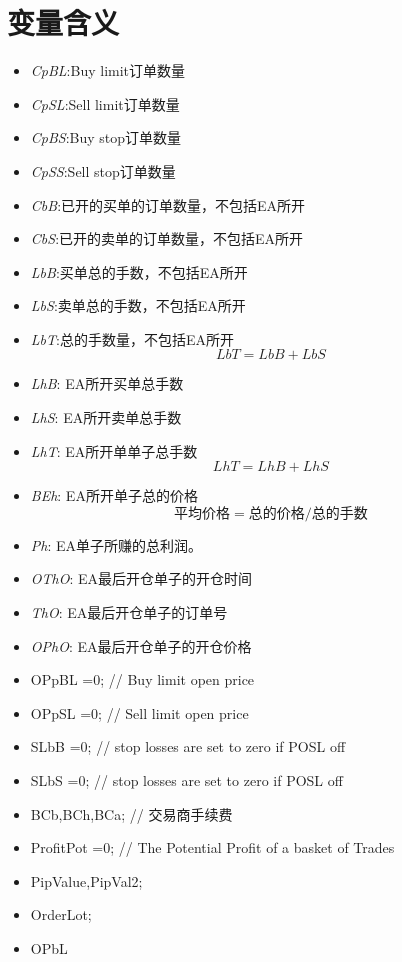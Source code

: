 \section{变量含义}
\begin{itemize}

\item \textit{CpBL}:Buy limit订单数量
\item \textit{CpSL}:Sell limit订单数量
\item \textit{CpBS}:Buy stop订单数量
\item \textit{CpSS}:Sell stop订单数量


\item \textit{CbB}:已开的买单的订单数量，不包括EA所开
\item \textit{CbS}:已开的卖单的订单数量，不包括EA所开
\item \textit{LbB}:买单总的手数，不包括EA所开
\item \textit{LbS}:卖单总的手数，不包括EA所开    
\item \textit{LbT}:总的手数量，不包括EA所开$$LbT = LbB+LbS $$



\item \textit{LhB}: EA所开买单总手数
\item \textit{LhS}: EA所开卖单总手数
\item \textit{LhT}: EA所开单单子总手数$$LhT = LhB + LhS$$
\item \textit{BEh}: EA所开单子总的价格$$平均价格=总的价格/总的手数$$
\item \textit{Ph}: EA单子所赚的总利润。
\item \textit{OThO}: EA最后开仓单子的开仓时间
\item \textit{ThO}: EA最后开仓单子的订单号
\item \textit{OPhO}: EA最后开仓单子的开仓价格

\item OPpBL        =0;     // Buy limit open price
\item OPpSL        =0;     // Sell limit open price
\item SLbB         =0;     // stop losses are set to zero if POSL off
\item SLbS         =0;     // stop losses are set to zero if POSL off
\item BCb,BCh,BCa;         // 交易商手续费
\item ProfitPot    =0;     // The Potential Profit of a basket of Trades
\item PipValue,PipVal2;
\item OrderLot;
\item OPbL


\end{itemize}
